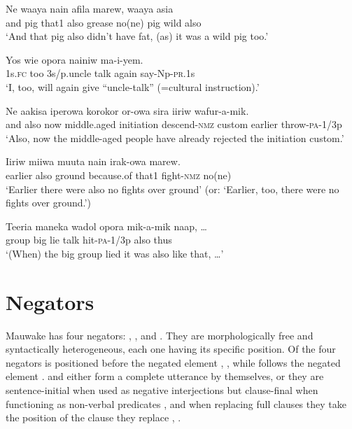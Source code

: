 \ea%
\label{ex:3:x749}
\gll Ne waaya nain  afila marew, waaya asia  \\
and pig that1 also grease no(ne) pig wild also\\
\glt`And that pig also didn't have fat, (as) it was a wild pig too.'
\z

\ea%
\label{ex:3:x1937}
\gll Yos  wie opora nainiw ma-i-yem. \\
1s.\textsc{fc} too 3s/p.uncle talk again say-Np-\textsc{pr}.1s\\
\glt`I, too, will again give ``uncle-talk'' (=cultural instruction).'
\z

\ea%
\label{ex:3:x750}
\gll Ne  aakisa iperowa korokor or-owa sira iiriw wafur-a-mik.\\
and also now middle.aged initiation descend-\textsc{nmz} custom earlier throw-\textsc{pa}-1/3p\\
\glt`Also, now the middle-aged people have already rejected the initiation custom.'
\z

\ea%
\label{ex:3:x751}
\gll Iiriw  miiwa muuta nain irak-owa marew. \\
earlier also ground because.of that1 fight-\textsc{nmz} no(ne)\\
\glt`Earlier there were also no fights over ground' (or: `Earlier, too, there were no fights over ground.')
\z

\ea%
\label{ex:3:x808}
\gll Teeria maneka wadol opora mik-a-mik  naap, {\dots} \\
group big lie talk hit-\textsc{pa}-1/3p also thus\\
\glt`(When) the big group lied it was also like that, {\dots}'
\z

\section{Negators} \label{sec:3.10}
{}
Mauwake has four negators: , ,  and . They are morphologically free and syntactically heterogeneous, each one having its specific position. Of the four negators  is positioned before the negated element  , , while  follows the negated element .  and  either form a complete utterance by themselves, or they are sentence-initial when used as negative interjections  but clause-final when functioning as non-verbal predicates , and when replacing full clauses they take the position of the clause they replace , . 

